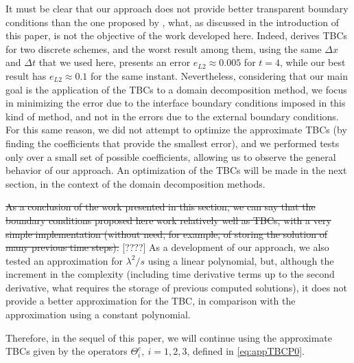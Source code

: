 \indent It must be clear that our approach does not provide better transparent boundary conditions than the one proposed by \cite{besse2015}, what, as discussed in the introduction of this paper, is not the objective of the work developed here. Indeed, \cite{besse2015} derives TBCs for two discrete schemes, and the worst result among them, using the same $\Delta x $ and $\Delta t$ that we used here, presents an error $e_{L2} \approx 0.005$ for $t = 4$, while our best result has $e_{L2} \approx 0.1$ for the same instant. Nevertheless, considering that our main goal is the application of the TBCs to a domain decomposition method, we focus in minimizing the error due to the interface boundary conditions imposed in this kind of method, and not in the errors due to the external boundary conditions. For this same reason, we did not attempt to optimize the approximate TBCs (by finding the coefficients that provide the smallest error), and we performed tests only over a small set of possible coefficients, allowing us to observe the general behavior of our approach. An optimization of the TBCs will be made in the next section, in the context of the domain decomposition methods.

\indent \begingroup \color{red} \sout{As a conclusion of the work presented in this section, we can say that the boundary conditions proposed here work relatively well as TBCs, with a very simple implementation (without need, for example, of storing the solution of many previous time steps).} [????] \endgroup As a development of our approach, we also tested an approximation for $\lambda^2/s$ using a linear polynomial, but, although the increment in the complexity (including time derivative terms up to the second derivative, what requires the storage of previous computed solutions), it does not provide a better approximation for the TBC, in comparison with the approximation using a constant polynomial.

\indent Therefore, in the sequel of this paper, we will continue using the approximate TBCs given by the operators $\Theta_i^{c}, \ i=1,2,3$, defined in \eqref{eq:appTBCP0}.